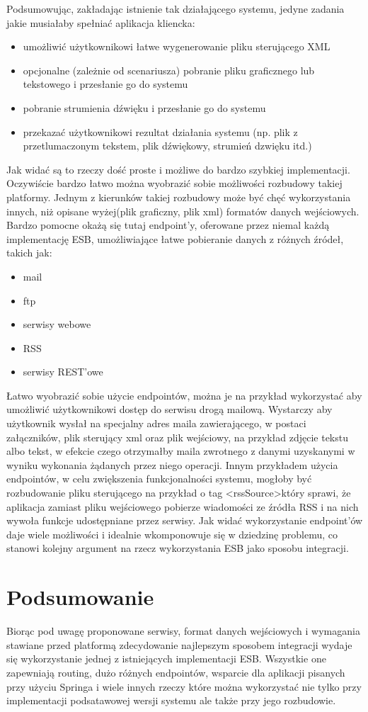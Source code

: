 Podsumowując, zakładając istnienie tak działającego systemu, jedyne zadania jakie musiałaby spełniać aplikacja kliencka:
\begin{itemize}
	\item umożliwić użytkownikowi łatwe wygenerowanie pliku sterującego XML
	\item opcjonalne (zależnie od scenariusza) pobranie pliku graficznego lub tekstowego i przesłanie go do systemu
	\item pobranie strumienia dźwięku i przesłanie go do systemu
	\item przekazać użytkownikowi rezultat działania systemu (np. plik z przetlumaczonym tekstem, plik dźwiękowy, strumień dzwięku itd.)
\end{itemize}
Jak widać są to rzeczy dość proste i możliwe do bardzo szybkiej implementacji. Oczywiście bardzo łatwo można wyobrazić sobie możliwości rozbudowy takiej platformy. Jednym z kierunków takiej rozbudowy może być chęć wykorzystania innych, niż opisane wyżej(plik graficzny, plik xml) formatów danych wejściowych.  Bardzo pomocne okażą się tutaj endpoint'y, oferowane przez niemal każdą implementację ESB, umożliwiające łatwe pobieranie danych z różnych źródeł, takich jak:
\begin{itemize}
	\item mail
	\item ftp
	\item serwisy webowe
	\item RSS
	\item serwisy REST'owe
\end{itemize}
Łatwo wyobrazić sobie użycie endpointów, można je na przykład wykorzystać aby umożliwić użytkownikowi dostęp do serwisu drogą mailową. Wystarczy aby użytkownik wysłał na specjalny adres maila zawierającego, w postaci załączników, plik sterujący xml oraz plik wejściowy, na przykład zdjęcie tekstu albo tekst, w efekcie czego otrzymałby maila zwrotnego z danymi uzyskanymi w wyniku wykonania żądanych przez niego operacji. Innym przykładem użycia endpointów, w celu zwiększenia funkcjonalności systemu, mogłoby być rozbudowanie pliku sterującego na przykład o tag \textless rssSource\textgreater który sprawi, że aplikacja zamiast pliku wejściowego pobierze wiadomości ze źródła RSS i na nich wywoła funkcje udostępniane przez serwisy. Jak widać wykorzystanie endpoint'ów daje wiele możliwości i idealnie wkomponowuje się w dziedzinę problemu, co stanowi kolejny argument na rzecz wykorzystania ESB jako sposobu integracji.

\section*{Podsumowanie}
Biorąc pod uwagę proponowane serwisy, format danych wejściowych i wymagania stawiane przed platformą zdecydowanie najlepszym sposobem integracji wydaje się wykorzystanie jednej z istniejących implementacji ESB. Wszystkie one zapewniają routing, dużo różnych endpointów, wsparcie dla aplikacji pisanych przy użyciu Springa i wiele innych rzeczy które można wykorzystać nie tylko przy implementacji podsatawowej wersji systemu ale także przy jego rozbudowie. 



